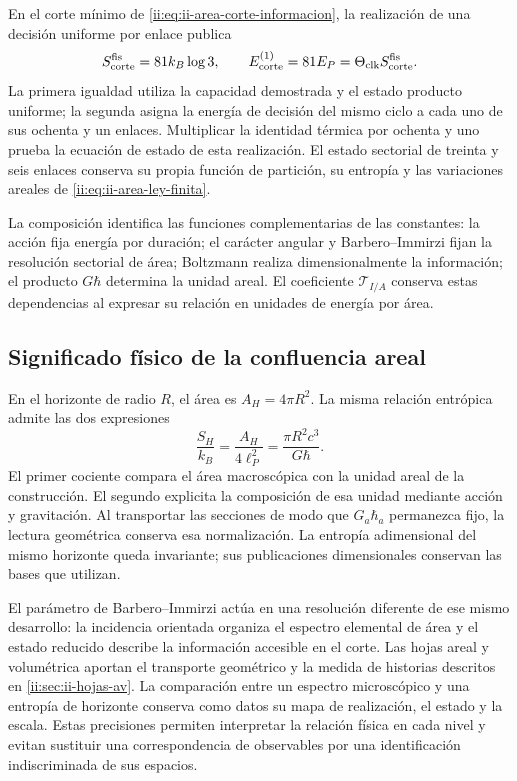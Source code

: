 En el corte mínimo de \eqref{ii:eq:ii-area-corte-informacion}, la
realización de una decisión uniforme por enlace publica
\begin{equation}
 S_{\rm corte}^{\rm fis}=81k_B\log3,
 \qquad
 E_{\rm corte}^{(1)}=81E_P
 =\Theta_{\rm clk}S_{\rm corte}^{\rm fis}.
 \label{ii:eq:ii-confluencia-corte-energia}
\end{equation}
La primera igualdad utiliza la capacidad demostrada y el estado producto
uniforme; la segunda asigna la energía de decisión del mismo ciclo a
cada uno de sus ochenta y un enlaces. Multiplicar la identidad térmica
por ochenta y uno prueba la ecuación de estado de esta realización.
El estado sectorial de treinta y seis enlaces conserva su propia
función de partición, su entropía y las variaciones areales de
\eqref{ii:eq:ii-area-ley-finita}.

La composición identifica las funciones complementarias de las
constantes: la acción fija energía por duración; el carácter angular
y Barbero--Immirzi fijan la resolución sectorial de área; Boltzmann
realiza dimensionalmente la información; el producto \(G\hbar\)
determina la unidad areal. El coeficiente \(\mathcal T_{I/A}\)
conserva estas dependencias al expresar su relación en unidades de
energía por área.

\subsection{Significado físico de la confluencia areal}

En el horizonte de radio \(R\), el área es \(A_H=4\pi R^2\).
La misma relación entrópica admite las dos expresiones
\[
 \frac{S_H}{k_B}=\frac{A_H}{4\ell_P^2}
 =\frac{\pi R^2c^3}{G\hbar}.
\]
El primer cociente compara el área macroscópica con la unidad areal
de la construcción. El segundo explicita la composición de esa unidad
mediante acción y gravitación. Al transportar las secciones de modo
que \(G_a\hbar_a\) permanezca fijo, la lectura geométrica conserva
esa normalización. La entropía adimensional del mismo horizonte queda
invariante; sus publicaciones dimensionales conservan las bases que
utilizan.

El parámetro de Barbero--Immirzi actúa en una resolución diferente
de ese mismo desarrollo: la incidencia orientada organiza el espectro
elemental de área y el estado reducido describe la información
accesible en el corte. Las hojas areal y volumétrica aportan el
transporte geométrico y la medida de historias descritos en
\cref{ii:sec:ii-hojas-av}. La comparación entre un espectro microscópico
y una entropía de horizonte conserva como datos su mapa de realización,
el estado y la escala. Estas precisiones permiten interpretar la
relación física en cada nivel y evitan sustituir una correspondencia
de observables por una identificación indiscriminada de sus espacios.

